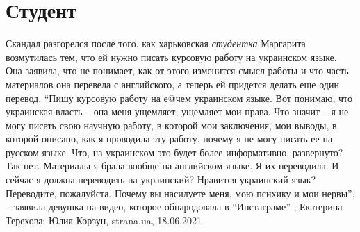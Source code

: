  
 
 
 
 
\chapter{Студент}
\label{sec:slova.student}

Скандал разгорелся после того, как харьковская \emph{студентка} Маргарита возмутилась
тем, что ей нужно писать курсовую работу на украинском языке.  Она заявила, что
не понимает, как от этого изменится смысл работы и что часть материалов она
перевела с английского, а теперь ей придется делать еще один перевод.  \enquote{Пишу
курсовую работу на е@чем украинском языке. Вот понимаю, что украинская власть –
она меня ущемляет, ущемляет мои права. Что значит – я не могу писать свою
научную работу, в которой мои заключения, мои выводы, в которой описано, как я
проводила эту работу, почему я не могу писать ее на русском языке. Что, на
украинском это будет более информативно, развернуто? Так нет.  Материалы я
брала вообще на английском языке. Я их переводила. И сейчас я должна переводить
на украинский? Нравится украинский язык? Переводите, пожалуйста. Почему вы
насилуете меня, мою психику и мои нервы}, – заявила девушка на видео, которое
обнародовала в \enquote{Инстаграме}
, 
Екатерина Терехова; Юлия Корзун, strana.ua, 18.06.2021

